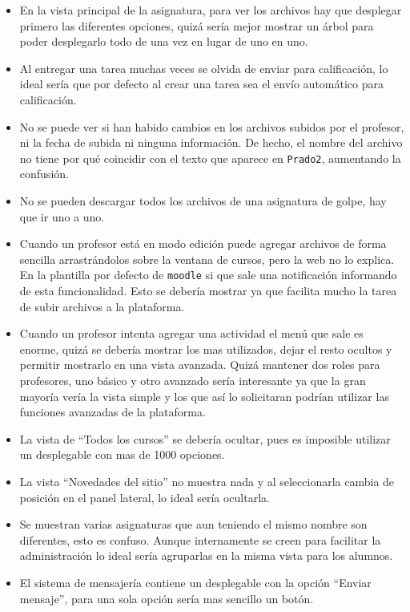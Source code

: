 \begin{itemize}
\item En la vista principal de la asignatura, para ver los archivos hay que desplegar primero las diferentes opciones, quizá sería mejor mostrar un árbol para poder desplegarlo todo de una vez en lugar de uno en uno.
\item Al entregar una tarea muchas veces se olvida de enviar para calificación, lo ideal sería que por defecto al crear una tarea sea el envío automático para calificación.
\item No se puede ver si han habido cambios en los archivos subidos por el profesor, ni la fecha de subida ni ninguna información. De hecho, el nombre del archivo no tiene por qué coincidir con el texto que aparece en \texttt{Prado2}, aumentando la confusión.
\item No se pueden descargar todos los archivos de una asignatura de golpe, hay que ir uno a uno.
\item Cuando un profesor está en modo edición puede agregar archivos de forma sencilla arrastrándolos sobre la ventana de cursos, pero la web no lo explica. En la plantilla por defecto de \texttt{moodle} si que sale una notificación informando de esta funcionalidad. Esto se debería mostrar ya que facilita mucho la tarea de subir archivos a la plataforma.
\item Cuando un profesor intenta agregar una actividad el menú que sale es enorme, quizá se debería mostrar los mas utilizados, dejar el resto ocultos y permitir mostrarlo en una vista avanzada. Quizá mantener dos roles para profesores, uno básico y otro avanzado sería interesante ya que la gran mayoría vería la vista simple y los que así lo solicitaran podrían utilizar las funciones avanzadas de la plataforma.
\item La vista de ``Todos los cursos'' se debería ocultar, pues es imposible utilizar un desplegable con mas de 1000 opciones.
\item La vista ``Novedades del sitio'' no muestra nada y al seleccionarla cambia de posición en el panel lateral, lo ideal sería ocultarla.
\item Se muestran varias asignaturas que aun teniendo el mismo nombre son diferentes, esto es confuso. Aunque internamente se creen para facilitar la administración lo ideal sería agruparlas en la misma vista para los alumnos.
\item El sistema de mensajería contiene un desplegable con la opción ``Enviar mensaje'', para una sola opción sería mas sencillo un botón.

\end{itemize}

